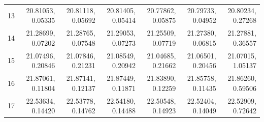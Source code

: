 \documentclass{article}
\begin{document}
\begin{enumerate}
\begin{table} [h]
\begin{tabular} {l r r r r r r}
				13 & 20.81053, 0.05335 & 20.81118, 0.05692 & 20.81405, 0.05414 & 20.77862, 0.05875 & 20.79733, 0.04952 & 20.80234, 0.27268 \\
				14 & 21.28699, 0.07202 & 21.28765, 0.07548 & 21.29053, 0.07273 & 21.25509, 0.07719 & 21.27380, 0.06815 & 21.27881, 0.36557 \\
				15 & 21.07496, 0.20846 & 21.07846, 0.21231 & 21.08549, 0.20942 & 21.04685, 0.21662 & 21.06501, 0.20456 & 21.07015, 1.05137 \\
				16 & 21.87061, 0.11804 & 21.87141, 0.12137 & 21.87449, 0.11871 & 21.83890, 0.12259 & 21.85758, 0.11435 & 21.86260, 0.59506 \\
				17 & 22.53634, 0.14420 & 22.53778, 0.14762 & 22.54180, 0.14488 & 22.50548, 0.14923 & 22.52404, 0.14049 & 22.52909, 0.72642 \\
				\bottomrule
			\end{tabular}
		\end{table}

	\end{enumerate}

	\clearpage
	
\end{document}
